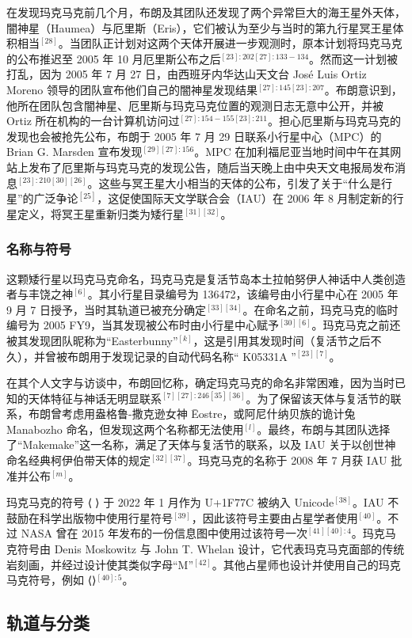 在发现玛克马克前几个月，布朗及其团队还发现了两个异常巨大的海王星外天体，闇神星（Haumea）与厄里斯（Eris），它们被认为至少与当时的第九行星冥王星体积相当$^{[28]}$。当团队正计划对这两个天体开展进一步观测时，原本计划将玛克马克的公布推迟至 2005 年 10 月厄里斯公布之后$^{[23]:202[27]:133-134}$。然而这一计划被打乱，因为 2005 年 7 月 27 日，由西班牙内华达山天文台 José Luis Ortiz Moreno 领导的团队宣布他们自己的闇神星发现结果$^{[27]:145[23]:207}$。布朗意识到，他所在团队包含闇神星、厄里斯与玛克马克位置的观测日志无意中公开，并被 Ortiz 所在机构的一台计算机访问过$^{[27]:154-155[23]:211}$。担心厄里斯与玛克马克的发现也会被抢先公布，布朗于 2005 年 7 月 29 日联系小行星中心（MPC）的 Brian G. Marsden 宣布发现$^{[29][27]:156}$。MPC 在加利福尼亚当地时间中午在其网站上发布了厄里斯与玛克马克的发现公告，随后当天晚上由中央天文电报局发布消息$^{[23]:210[30][26]}$。这些与冥王星大小相当的天体的公布，引发了关于“什么是行星”的广泛争论$^{[25]}$，这促使国际天文学联合会（IAU）在 2006 年 8 月制定新的行星定义，将冥王星重新归类为矮行星$^{[31][32]}$。
\subsubsection{名称与符号}
这颗矮行星以玛克马克命名，玛克马克是复活节岛本土拉帕努伊人神话中人类创造者与丰饶之神$^{[6]}$。其小行星目录编号为 136472，该编号由小行星中心在 2005 年 9 月 7 日授予，当时其轨道已被充分确定$^{[33][34]}$。在命名之前，玛克马克的临时编号为 2005 FY9，当其发现被公布时由小行星中心赋予$^{[30][6]}$。玛克马克之前还被其发现团队昵称为“Easterbunny”$^{[k]}$，这是引用其发现时间（复活节之后不久），并曾被布朗用于发现记录的自动代码名称“ K05331A ”$^{[23][7]}$。

在其个人文字与访谈中，布朗回忆称，确定玛克马克的命名非常困难，因为当时已知的天体特征与神话无明显联系$^{[7][27]:246[35][36]}$。为了保留该天体与复活节的联系，布朗曾考虑用盎格鲁-撒克逊女神 Ēostre，或阿尼什纳贝族的诡计兔 Manabozho 命名，但发现这两个名称都无法使用$^{[l]}$。最终，布朗与其团队选择了“Makemake”这一名称，满足了天体与复活节的联系，以及 IAU 关于以创世神命名经典柯伊伯带天体的规定$^{[32][37]}$。玛克马克的名称于 2008 年 7 月获 IAU 批准并公布$^{[m]}$。

玛克马克的符号 ⟨🝼⟩ 于 2022 年 1 月作为 U+1F77C 被纳入 Unicode$^{[38]}$。IAU 不鼓励在科学出版物中使用行星符号$^{[39]}$，因此该符号主要由占星学者使用$^{[40]}$。不过 NASA 曾在 2015 年发布的一份信息图中使用过该符号一次$^{[41][40]:4}$。玛克马克符号由 Denis Moskowitz 与 John T. Whelan 设计，它代表玛克马克面部的传统岩刻画，并经过设计使其类似字母“M”$^{[42]}$。其他占星师也设计并使用自己的玛克马克符号，例如 ⟨⟩$^{[40]:5}$。
\subsection{轨道与分类}
